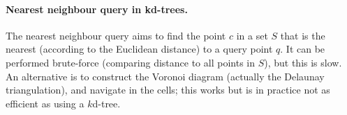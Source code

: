 \paragraph{Nearest neighbour query in kd-trees.}
\label{sec:knn}

The nearest neighbour query aims to find the point $c$ in a set $S$ that is the nearest (according to the Euclidean distance) to a query point $q$.
It can be performed brute-force (comparing distance to all points in $S$), but this is slow.
An alternative is to construct the Voronoi diagram (actually the Delaunay triangulation), and navigate in the cells; this works but is in practice not as efficient as using a $k$d-tree.


%

